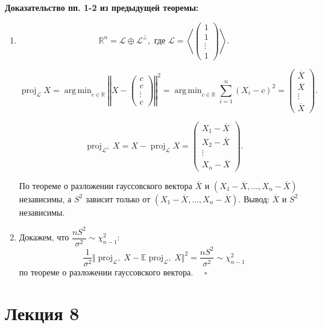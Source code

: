 \documentclass[12pt]{report}
\DeclareMathOperator*{\argmin}{arg\,min}
\theoremstyle{definition}
\begin{document}
\textbf{Доказательство пп. 1-2 из предыдущей теоремы:}
\begin{enumerate}
\item $$\mathbb{R}^n = \mathcal{L} \oplus \mathcal{L}^\bot, \text{ где } \mathcal{L} = \left\langle \begin{pmatrix} 1 \\ 1 \\ \vdots \\ 1 \end{pmatrix} \right\rangle .$$

$$\operatorname{proj}_\mathcal{L} X = \argmin_{c \in \mathbb{R}} \left\Vert X - \begin{pmatrix} c \\ c \\ \vdots \\ c \end{pmatrix} \right\Vert^2 = \argmin_{c\in \mathbb{R}} \displaystyle\sum_{i=1}^n (X_i - c)^2 = \begin{pmatrix} \overline{X} \\ \overline{X} \\ \vdots \\ \overline{X} \end{pmatrix}.$$

$$\operatorname{proj}_\mathcal{L^\bot} X = X - \operatorname{proj}_\mathcal{L} X = \begin{pmatrix} X_1 - \overline{X} \\ X_2 - \overline{X} \\ \vdots \\ X_n - \overline{X} \end{pmatrix}. $$

По теореме о разложении гауссовского вектора $\overline{X}$ и $(X_1 - \overline{X}, \dots, X_n - \overline{X})$ независимы, а $S^2$ зависит только от $(X_1 - \overline{X}, \dots, X_n - \overline{X})$. Вывод: $\overline{X}$ и $S^2$ независимы.

\item Докажем, что $\dfrac{nS^2}{\sigma^2} \sim \chi_{n-1}^2$:
$$ \dfrac{1}{\sigma^2}\Vert \operatorname{proj}_\mathcal{L^\bot} X - \mathbb{E}\operatorname{proj}_\mathcal{L^\bot} X \Vert^2 = \dfrac{nS^2}{\sigma^2} \sim \chi_{n-1}^2 $$
по теореме о разложении гауссовского вектора. $\quad \square$
\end{enumerate}


\section{Лекция 8}
\end{document}
